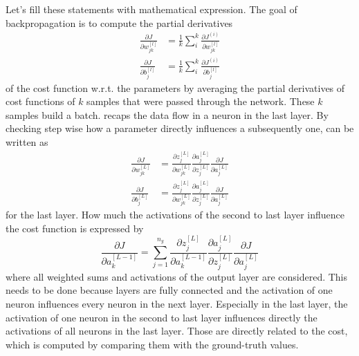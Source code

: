 Let's fill these statements with mathematical expression.
The goal of backpropagation is to compute the partial derivatives
\begin{subequations}
	\label{eq:backpropagation}
	\begin{align}
		\frac{\partial J}{\partial w^{[l]}_{jk}} &= \frac{1}{k} \sum_{i}^{k} \frac{\partial J^{(i)}}{\partial w^{[l]}_{jk}} \\
		\frac{\partial J}{\partial b^{[l]}_j} &= \frac{1}{k} \sum_{i}^{k} \frac{\partial J^{(i)}}{\partial b^{[l]}_j}
	\end{align}
\end{subequations}
of the cost function w.r.t. the parameters by averaging the partial derivatives of cost functions of $k$ samples that were passed through the network.
These $k$ samples build a batch.
 recaps the data flow in a neuron in the last layer.
By checking step wise how a parameter directly influences a subsequently one,  can be written as
\begin{subequations}
	\label{eq:backpropagation-last}
	\begin{align}
		\frac{\partial J}{\partial w^{[L]}_{jk}} &= \frac{\partial z^{[L]}_j}{\partial w^{[L]}_{jk}} \frac{\partial a^{[L]}_{j}}{\partial z^{[L]}_{j}} \frac{\partial J}{\partial a^{[L]}_{j}} \\
		\frac{\partial J}{\partial b^{[L]}_{j}} &= \frac{\partial z^{[L]}_j}{\partial w^{[L]}_{jk}} \frac{\partial a^{[L]}_{j}}{\partial z^{[L]}_{j}} \frac{\partial J}{\partial a^{[L]}_{j}}
	\end{align}
\end{subequations}
for the last layer.
How much the activations of the second to last layer influence the cost function is expressed by
\begin{equation}
	\label{eq:backpropagation-activations-last}
	\frac{\partial J}{\partial a^{[L-1]}_{k}} = \sum_{j=1}^{n_y} \frac{\partial z^{[L]}_j}{\partial a^{[L-1]}_{k}} \frac{\partial a^{[L]}_{j}}{\partial z^{[L]}_{j}} \frac{\partial J}{\partial a^{[L]}_{j}}
\end{equation}
where all weighted sums and activations of the output layer are considered.
This needs to be done because layers are fully connected and the activation of one neuron influences every neuron in the next layer.
Especially in the last layer, the activation of one neuron in the second to last layer influences directly the activations of all neurons in the last layer.
Those are directly related to the cost, which is computed by comparing them with the ground-truth values.
